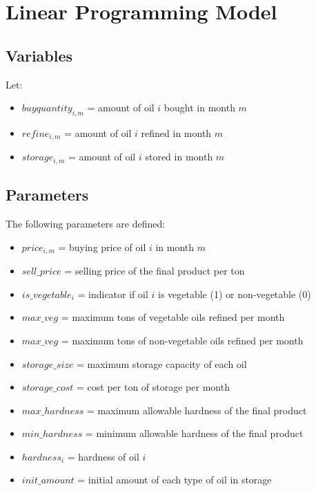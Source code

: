 \documentclass{article}
\begin{document}
\section*{Linear Programming Model}

\subsection*{Variables}

Let:
\begin{itemize}
    \item \( buyquantity_{i,m} \) = amount of oil \( i \) bought in month \( m \) 
    \item \( refine_{i,m} \) = amount of oil \( i \) refined in month \( m \) 
    \item \( storage_{i,m} \) = amount of oil \( i \) stored in month \( m \) 
\end{itemize}

\subsection*{Parameters}

The following parameters are defined:
\begin{itemize}
    \item \( price_{i,m} \) = buying price of oil \( i \) in month \( m \)
    \item \( sell\_price \) = selling price of the final product per ton
    \item \( is\_vegetable_{i} \) = indicator if oil \( i \) is vegetable (1) or non-vegetable (0)
    \item \( max\_veg \) = maximum tons of vegetable oils refined per month
    \item \( max\_veg \) = maximum tons of non-vegetable oils refined per month
    \item \( storage\_size \) = maximum storage capacity of each oil
    \item \( storage\_cost \) = cost per ton of storage per month
    \item \( max\_hardness \) = maximum allowable hardness of the final product
    \item \( min\_hardness \) = minimum allowable hardness of the final product
    \item \( hardness_{i} \) = hardness of oil \( i \)
    \item \( init\_amount \) = initial amount of each type of oil in storage
\end{itemize}
\end{document}
